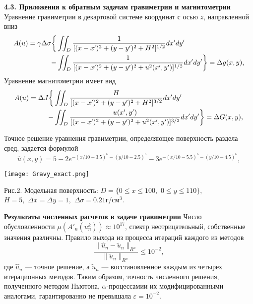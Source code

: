 \documentclass[10pt,pdf, mathserif, hyperref={unicode}]{beamer}
\begin{document}
\begin{frame}{\small\textbf{4.3. Приложения к обратным задачам гравиметрии и магнитометрии}}
	Уравнение гравиметрии в декартовой системе координат с осью $z$, направленной вниз 
	\begin{equation*}
	\begin{aligned}
	A(u)=\gamma\Delta\sigma \bigg\{ &\iint_{D} \frac{1}{[(x-x')^2+(y-y')^2+H^2]^{1/2}}dx'dy' \notag\\
	- &\iint_{D} \frac{1}{[(x-x')^2+(y-y')^2+u^2(x',y')]^{1/2}}dx'dy'\bigg\}=\Delta g(x,y),
	\end{aligned} 
	\end{equation*}
	Уравнение магнитометрии имеет вид
	\begin{equation*}\begin{aligned}
	A(u)=\Delta J  \bigg\{&\iint_{D} \frac{H}{[(x-x')^2+(y-y')^2+H^2]^{3/2}}dx'dy' \notag\\
	- &\iint_{D} \frac{u(x',y')}{[(x-x')^2+(y-y')^2+u^2(x',y')]^{3/2}}dx'dy' \bigg\}=\Delta G(x,y),
	\end{aligned} \end{equation*}
\end{frame}
\begin{frame}
	Точное решение уравнения гравиметрии, определяющее поверхность раздела сред, задается формулой %
	\begin{equation*}
	\hat{u}(x,y)=5-2e^{-(x/10-3.5)^6-(y/10-2.5)^6}-3e^{-(x/10-5.5)^6-(y/10-4.5)^6},
	\end{equation*}
	\begin{center}
		
		\texttt{[image: Gravy\_exact.png]}            %
	\end{center}
	
	\begin{center}
		Рис.2. Модельная поверхность: $D=\{0\le x\le 100, \,\,0\le y\le 110\}$, \\ $  H=5,\,\,\Delta x=\Delta y=1,\,\,\Delta\sigma=0.21$г/см$^3$.
	\end{center}
\end{frame}
\begin{frame}{\small\textbf{Результаты численных расчетов в задаче гравиметрии}}
	Число обусловленности $\mu(A'_n(u_n^k))\approx 10^{17}$, спектр неотрицательный, собственные значения различны. Правило выхода из процесса итераций каждого из методов
	$$\frac{\|\hat{u}_n-\tilde{u}_n\|_{R^n}}{\|\tilde{u}_n\|_{R^n}}\le 10^{-2},$$
	где $\hat{u}_n$ --- точное решение, а $\tilde{u}_n$ --- восстановленное каждым из четырех итерационных методов. Таким образом, точность численного решения, полученного методом Ньютона, $\alpha$-процессамии их модифицированными аналогами, гарантированно не превышала $\varepsilon=10^{-2}$.
\end{frame}
\end{document}
